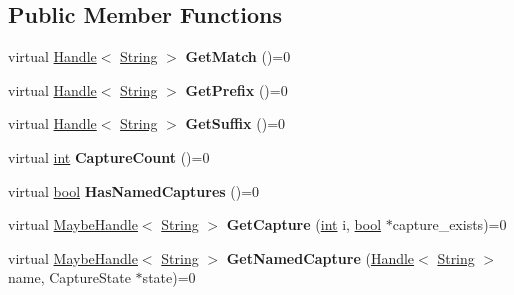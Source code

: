 \subsection*{Public Member Functions}
\begin{DoxyCompactItemize}
\item 
\mbox{\label{classv8_1_1internal_1_1String_1_1Match_af4001e9737e59a17d1c466f8fce742af}} 
virtual \mbox{\hyperlink{classv8_1_1internal_1_1Handle}{Handle}}$<$ \mbox{\hyperlink{classv8_1_1internal_1_1String}{String}} $>$ {\bfseries Get\+Match} ()=0
\item 
\mbox{\label{classv8_1_1internal_1_1String_1_1Match_afb86816ef754339c694837bb0b4469f6}} 
virtual \mbox{\hyperlink{classv8_1_1internal_1_1Handle}{Handle}}$<$ \mbox{\hyperlink{classv8_1_1internal_1_1String}{String}} $>$ {\bfseries Get\+Prefix} ()=0
\item 
\mbox{\label{classv8_1_1internal_1_1String_1_1Match_a395e828f07ffd3c981101670398123e0}} 
virtual \mbox{\hyperlink{classv8_1_1internal_1_1Handle}{Handle}}$<$ \mbox{\hyperlink{classv8_1_1internal_1_1String}{String}} $>$ {\bfseries Get\+Suffix} ()=0
\item 
\mbox{\label{classv8_1_1internal_1_1String_1_1Match_a382d5424bc4d197567e9c9fa5ac2078d}} 
virtual \mbox{\hyperlink{classint}{int}} {\bfseries Capture\+Count} ()=0
\item 
\mbox{\label{classv8_1_1internal_1_1String_1_1Match_a89de94cd6e117ea2afc53653359a1726}} 
virtual \mbox{\hyperlink{classbool}{bool}} {\bfseries Has\+Named\+Captures} ()=0
\item 
\mbox{\label{classv8_1_1internal_1_1String_1_1Match_a8671aba87d600ebdf5168dfea4a61058}} 
virtual \mbox{\hyperlink{classv8_1_1internal_1_1MaybeHandle}{Maybe\+Handle}}$<$ \mbox{\hyperlink{classv8_1_1internal_1_1String}{String}} $>$ {\bfseries Get\+Capture} (\mbox{\hyperlink{classint}{int}} i, \mbox{\hyperlink{classbool}{bool}} $\ast$capture\+\_\+exists)=0
\item 
\mbox{\label{classv8_1_1internal_1_1String_1_1Match_aa2970a7b2615b642f491046c6be1a341}} 
virtual \mbox{\hyperlink{classv8_1_1internal_1_1MaybeHandle}{Maybe\+Handle}}$<$ \mbox{\hyperlink{classv8_1_1internal_1_1String}{String}} $>$ {\bfseries Get\+Named\+Capture} (\mbox{\hyperlink{classv8_1_1internal_1_1Handle}{Handle}}$<$ \mbox{\hyperlink{classv8_1_1internal_1_1String}{String}} $>$ name, Capture\+State $\ast$state)=0
\end{DoxyCompactItemize}


